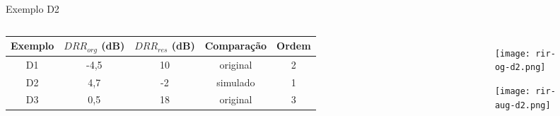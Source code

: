 \begin{frame}{Exemplo D2}
    \begin{columns}

        \begin{table} [H]
            \begin{adjustbox}{width=\columnwidth,center}
                \begin{tabular}{c|c|c|c|c}
            
                    \textbf{Exemplo} & 
                    \textbf{$DRR_{org}$ (dB)} & 
                    \textbf{$DRR_{res}$ (dB)} & 
                    \textbf{Comparação} &
                    \textbf{Ordem} \\
                    \hline 
            
                    D1 & -4,5 & 10 & original & 2 \\
                    D2 & 4,7 & -2 & simulado & 1 \\
                    D3 & 0,5 & 18 & original & 3 \\
            
                \end{tabular}
            \end{adjustbox}
        \end{table}

        \begin{figure}
            \begin{subfigure}{\textwidth}
                \centering
                \texttt{[image: rir-og-d2.png]}
            \end{subfigure}
            \begin{subfigure}{\textwidth}
                \centering
                \texttt{[image: rir-aug-d2.png]}
            \end{subfigure}
        \end{figure}
    \end{columns}
        
\end{frame}

